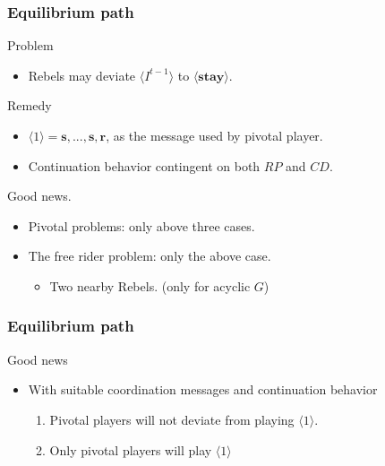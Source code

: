 \documentclass[10pt]{beamer}
\begin{document}
\begin{frame}
\frametitle{Equilibrium path}

Problem
\begin{itemize}
\item Rebels may deviate $\langle I^{t-1} \rangle$ to $\langle \textbf{stay} \rangle$.
\end{itemize}

Remedy
\begin{itemize}
\item $\langle 1 \rangle= \textbf{s},...,\textbf{s},\textbf{r}$, as the message used by pivotal player.
\item Continuation behavior contingent on both $RP$ and $CD$.

\end{itemize}

Good news. 
\begin{itemize}
\item Pivotal problems: only above three cases.
\item The free rider problem: only the above case.
\begin{itemize}
\item Two nearby Rebels. (only for acyclic $G$)
\end{itemize}

\end{itemize}

\end{frame}





\begin{frame}
\frametitle{Equilibrium path}

Good news
\begin{itemize}
\item With suitable coordination messages and continuation behavior
\begin{enumerate}
\item Pivotal players will not deviate from playing $\langle 1 \rangle$.
\item Only pivotal players will play $\langle 1 \rangle$
\end{enumerate}


\end{itemize}


\end{frame}
\end{document}
